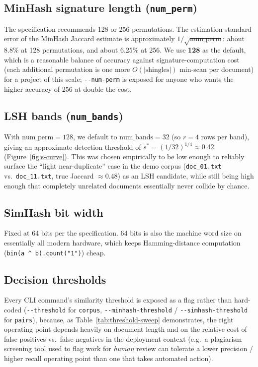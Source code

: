 \documentclass[11pt]{article}
\begin{document}
\subsection{MinHash signature length (\texttt{num\_perm})}

The specification recommends 128 or 256 permutations. The estimation standard error of the MinHash Jaccard
estimate is approximately $1/\sqrt{\text{num\_perm}}$: about $8.8\%$ at 128 permutations, and about
$6.25\%$ at 256. We use \textbf{128} as the default, which is a reasonable balance of accuracy against
signature-computation cost (each additional permutation is one more $O(|\text{shingles}|)$ min-scan per
document) for a project of this scale; \verb|--num-perm| is exposed for anyone who wants the higher
accuracy of 256 at double the cost.

\subsection{LSH bands (\texttt{num\_bands})}

With $\text{num\_perm}=128$, we default to $\text{num\_bands}=32$ (so $r=4$ rows per band), giving an
approximate detection threshold of $s^{*} = (1/32)^{1/4} \approx 0.42$ (Figure~\ref{fig:s-curve}). This
was chosen empirically to be low enough to reliably surface the ``light near-duplicate'' case in the demo
corpus (\verb|doc_01.txt| vs.\ \verb|doc_11.txt|, true Jaccard $\approx 0.48$) as an LSH candidate, while
still being high enough that completely unrelated documents essentially never collide by chance.

\subsection{SimHash bit width}

Fixed at 64 bits per the specification. 64 bits is also the machine word size on essentially all modern
hardware, which keeps Hamming-distance computation (\verb|bin(a ^ b).count("1")|) cheap.

\subsection{Decision thresholds}

Every CLI command's similarity threshold is exposed as a flag rather than hard-coded
(\verb|--threshold| for \texttt{corpus}, \verb|--minhash-threshold| / \verb|--simhash-threshold| for
\texttt{pairs}), because, as Table~\ref{tab:threshold-sweep} demonstrates, the right operating point
depends heavily on document length and on the relative cost of false positives vs.\ false negatives in the
deployment context (e.g.\ a plagiarism screening tool used to flag work for \emph{human} review can
tolerate a lower precision / higher recall operating point than one that takes automated action).
\end{document}
